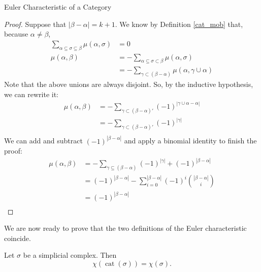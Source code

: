 \documentclass[12pt]{pom_thesis}
\DeclareMathOperator{\cat}{cat}
\begin{document}
\begin{chapter}{Euler Characteristic of a Category}
\begin{proof}
Suppose that $|\beta - \alpha| = k+1$. We know by Definition \ref{cat_mob} that, because $\alpha \neq \beta$,
 \begin{align*}
\sum_{\alpha \subseteq \sigma \subseteq \beta} \mu(\alpha, \sigma)&= 0\\
\mu(\alpha, \beta) &=  - \sum_{\alpha \subseteq \sigma \subset \beta} \mu(\alpha, \sigma)\\
&= - \sum_{\gamma \subset (\beta - \alpha)} \mu(\alpha, \gamma \cup \alpha) 
\end{align*}
Note that the above unions are always disjoint. So, by the inductive hypothesis, we can rewrite it:
\begin{align*}
\mu(\alpha, \beta) &= - \sum_{\gamma \subset (\beta - \alpha)'} (-1)^{|\gamma \cup \alpha - \alpha|} \\ %
&= - \sum_{\gamma \subset (\beta - \alpha)'} (-1)^{|\gamma|}\\ %
\end{align*}
We can add and subtract $(-1)^{|\beta - \alpha|}$ and apply a binomial identity to finish the proof:
\begin{align*}
\mu(\alpha, \beta) &= - \sum_{\gamma \subseteq (\beta - \alpha)} (-1)^{|\gamma|} + (-1)^{|\beta - \alpha|} \\ 
&= (-1)^{|\beta - \alpha|} -  \sum_{i = 0}^{|\beta - \alpha|}(-1)^i{|\beta- \alpha| \choose i}\\ 
&= (-1)^{|\beta - \alpha|} \\ 
\end{align*}
\end{proof}
We are now ready to prove that the two definitions of the Euler characteristic coincide.
\begin{thm}
\label{consistentEuler}
Let $\sigma$ be a simplicial complex. Then 
\[
\chi(\cat(\sigma)) = \chi(\sigma).
\]


\end{thm}
\end{chapter}
\end{document}

